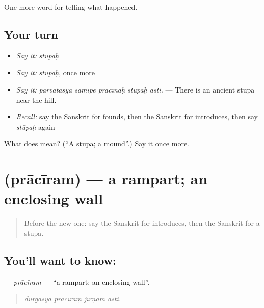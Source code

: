 \begin{grammarlens}[title={What you've built}]
One more word for telling what happened.
\end{grammarlens}

\subsection*{Your turn}
\begin{itemize}
\raggedright
  \item \emph{Say it:} \emph{stūpaḥ}
  \item \emph{Say it:} \emph{stūpaḥ}, once more
  \item \emph{Say it:} \emph{parvatasya samīpe prācīnaḥ stūpaḥ asti.} — There is an ancient stupa near the hill.
  \item \emph{Recall:} say the Sanskrit for founds, then the Sanskrit for introduces, then say \emph{stūpaḥ} again
\end{itemize}

\begin{tcolorbox}[breakable,colback=teal!4,colframe=teal!35!black,title={Before you move on}]
What does  mean? (\textquotedblleft{}A stupa; a mound\textquotedblright{}.) Say it once more.
\end{tcolorbox}
\section[\texorpdfstring{\sk{प्राचीरम्} (prācīram)}{प्राचीरम् (prācīram)}]{ (prācīram) — a rampart; an enclosing wall}

\label{lesson:SA-C323-praciram}



\begin{quote}
Before the new one: say the Sanskrit for introduces, then the Sanskrit for a stupa.
\end{quote}

\subsection*{You'll want to know: }
\textbf{} — \emph{prācīram} — \textquotedblleft{}a rampart; an enclosing wall\textquotedblright{}.

\begin{quote}
   
\end{quote}

\begin{quote}
\emph{durgasya prācīraṃ jīrṇam asti.}
\end{quote}


